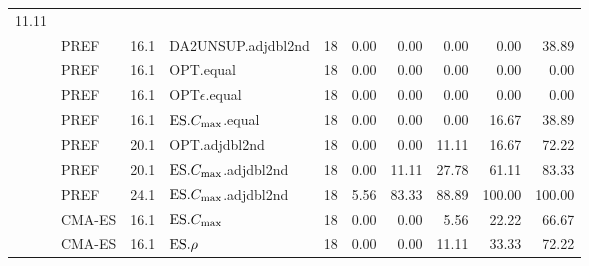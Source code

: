 \begin{table}
{\begin{tabular}{llllrrrrrr}
11.11 \\ 
& PREF & 16.1 & DA2UNSUP.adjdbl2nd & 18 & 0.00 & 0.00 & 0.00 & 0.00 & 38.89 
 \\ 
& PREF & 16.1 & OPT.equal & 18 & 0.00 & 0.00 & 0.00 & 0.00 & 0.00 \\ 
& PREF & 16.1 & OPT$\epsilon$.equal & 18 & 0.00 & 0.00 & 0.00 & 0.00 & 0.00 \\ 
& PREF & 16.1 & $\text{ES}.{C_{\max}}$.equal & 18 & 0.00 & 0.00 & 0.00 & 16.67 & 38.89 \\ 
& PREF & 20.1 & OPT.adjdbl2nd & 18 & 0.00 & 0.00 & 11.11 & 16.67 & 72.22 \\ 
& PREF & 20.1 & $\text{ES}.{C_{\max}}$.adjdbl2nd & 18 & 0.00 & 11.11 & 27.78 & 61.11 & 
83.33 \\ 
& PREF & 24.1 & $\text{ES}.{C_{\max}}$.adjdbl2nd & 18 & 5.56 & 83.33 & 88.89 & 100.00 &  
100.00 \\ \cmidrule(r){2-10}
 & CMA-ES & 16.1 & $\text{ES}.{C_{\max}}$ & 18 & 0.00 & 0.00 & 5.56 & 22.22 & 66.67 \\ 
 & CMA-ES & 16.1 & $\text{ES}.{\rho}$ & 18 & 0.00 & 0.00 & 11.11 & 33.33 & 72.22 \\ 
\bottomrule
\end{tabular}}
\end{table}